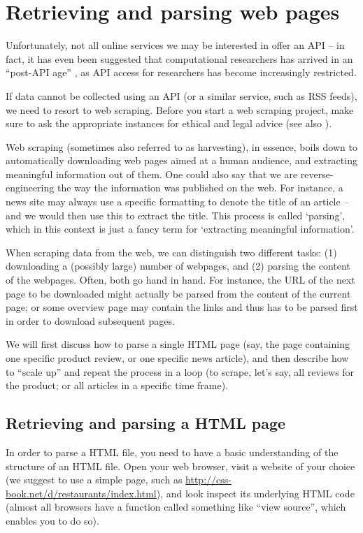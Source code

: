 \section{Retrieving and parsing web pages}
\label{sec:webpages}

Unfortunately, not all online services we may be interested in offer
an API -- in fact, it has even been suggested that computational
researchers has arrived in an ``post-API age'' \citep{Freelon2018}, as
API access for researchers has become increasingly restricted.

If data cannot be collected using an API (or a similar service, such
as RSS feeds), we need to resort to web scraping. Before you start a
web scraping project, make sure to ask the appropriate instances for
ethical and legal advice (see also ).

Web scraping (sometimes also referred to as harvesting), in essence,
boils down to automatically downloading web pages aimed at a human
audience, and extracting meaningful information out of them. One could
also say that we are reverse-engineering the way the information was
published on the web. For instance, a news site may always use a
specific formatting to denote the title of an article -- and we would
then use this to extract the title. This process is called `parsing',
which in this context is just a fancy term for `extracting meaningful
information'.

When scraping data from the web, we can distinguish two different
tasks: (1) downloading a (possibly large) number of webpages, and (2)
parsing the content of the webpages. Often, both go hand in
hand. For instance, the URL of the next page to be downloaded might
actually be parsed from the content of the current page; or some
overview page may contain the links and thus has to be parsed first in
order to download subsequent pages.

We will first discuss how to parse a single HTML page (say, the page
containing one specific product review, or one specific news article),
and then describe how to ``scale up'' and repeat the process in a
loop (to scrape, let's say, all reviews for the product; or all
articles in a specific time frame).




\subsection{Retrieving and parsing a HTML page}
\label{sec:parsehtml}
In order to parse a HTML file, you need to have a basic understanding
of the structure of an HTML file. Open your web browser, visit a
website of your choice (we suggest to use a simple page, such as
\url{http://css-book.net/d/restaurants/index.html}), and
look inspect its underlying HTML code (almost all browsers have a
function called something like ``view source'', which enables you to
do so).

